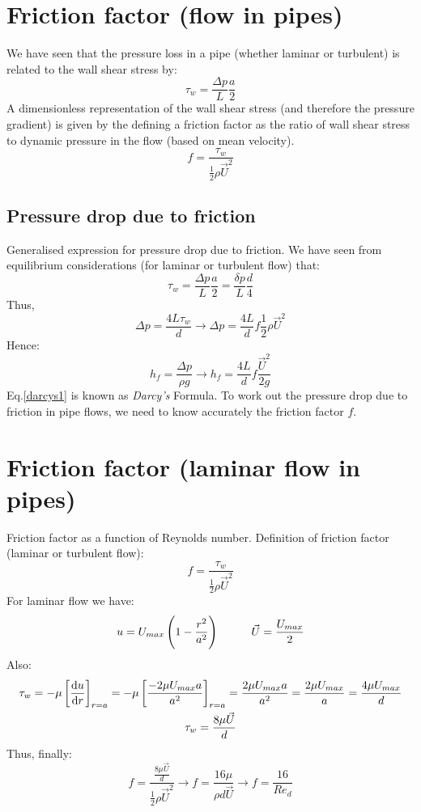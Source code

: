 \section{Friction factor (flow in pipes)}
We have seen that the pressure loss in a pipe (whether laminar or turbulent) is related to the wall shear stress by:
\begin{equation}
  \tau_w = \frac{\Delta p}{L}\frac{a}{2}
\end{equation}
A dimensionless representation of the wall shear stress (and therefore the pressure gradient) is given by the defining a friction factor as the ratio of wall shear stress to dynamic pressure in the flow (based on mean velocity).
\begin{equation}
  f = \frac{\tau_w}{\frac{1}{2}\rho \vec{U}^2}
\end{equation}
\subsection{Pressure drop due to friction}
Generalised expression for pressure drop due to friction. We have seen from equilibrium considerations (for laminar or turbulent flow) that:
\begin{equation}
  \tau_w = \frac{\Delta p}{L} \frac{a}{2} = \frac{\delta p}{L} \frac{d}{4}
\end{equation}
Thus,
\begin{equation}
  \Delta p = \frac{4L\tau_w}{d}\rightarrow \Delta p =\frac{4L}{d} f \frac{1}{2} \rho \vec{U}^2
\end{equation}
Hence:
\begin{equation}
  h_f = \frac{\Delta p}{\rho g} \rightarrow h_f = \frac{4L}{d} f \frac{\vec{U}^2}{2g} \label{darcys1}
\end{equation}
Eq.\ref{darcys1} is known as \textit{Darcy's} Formula. To work out the pressure drop due to friction in pipe flows, we need to know accurately the friction factor $f$.
\section{Friction factor (laminar flow in pipes)}
Friction factor as a function of Reynolds number. Definition of friction factor (laminar or turbulent flow):
\begin{equation}
  f = \frac{\tau_w}{\frac{1}{2}\rho \vec{U}^2}
\end{equation}
For laminar flow we have:
\begin{equation}
  u = U_{max} \left(1-\frac{r^2}{a^2}\right) \makebox[1cm]{} \vec{U} = \frac{U_{max}}{2}
\end{equation}
Also:
\begin{gather}
  \tau_w = - \mu \left[\frac{\dif u}{\dif r}\right]_{r=a} = -\mu \left[\frac{-2\mu U_{max}a}{a^2}\right]_{r=a} = \frac{2\mu U_{max} a}{a^2} = \frac{2\mu U_{max}}{a} = \frac{4\mu U_{max}}{d}\\
  \tau_w = \frac{8\mu\vec{U}}{d}
\end{gather}
Thus, finally:
\begin{equation}
  f= \frac{\frac{8\mu\vec{U}}{d}}{\frac{1}{2}\rho \vec{U}^2} \rightarrow f = \frac{16\mu}{\rho d \vec{U}} \rightarrow f = \frac{16}{Re_d}
\end{equation}

